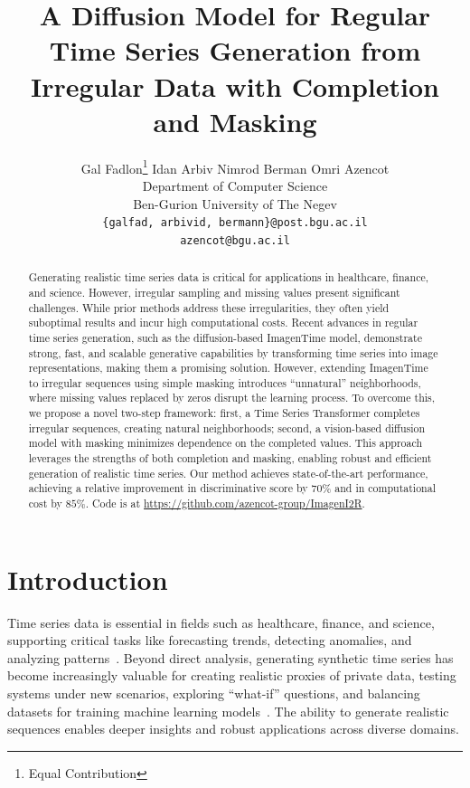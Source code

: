 \documentclass{article}
\title{A Diffusion Model for Regular Time Series Generation from Irregular Data with Completion and Masking}
\author{%
Gal Fadlon\thanks{Equal Contribution} \hspace{0.3em}
Idan Arbiv\footnotemark[1] \hspace{0.3em}
Nimrod Berman \hspace{0.3em}
Omri Azencot \\
Department of Computer Science \\
Ben-Gurion University of The Negev \\
\tt\small{{\{galfad, arbivid, bermann\}@post.bgu.ac.il}} \\
\tt\small{{azencot@bgu.ac.il}} \\
}
\theoremstyle{plain}
\theoremstyle{definition}
\theoremstyle{remark}
\begin{document}
\maketitle


\begin{abstract}
  Generating realistic time series data is critical for applications in healthcare, finance, and science. However, irregular sampling and missing values present significant challenges. While prior methods address these irregularities, they often yield suboptimal results and incur high computational costs. Recent advances in regular time series generation, such as the diffusion-based ImagenTime model, demonstrate strong, fast, and scalable generative capabilities by transforming time series into image representations, making them a promising solution. However, extending ImagenTime to irregular sequences using simple masking introduces ``unnatural'' neighborhoods, where missing values replaced by zeros disrupt the learning process. To overcome this, we propose a novel two-step framework: first, a Time Series Transformer completes irregular sequences, creating natural neighborhoods; second, a vision-based diffusion model with masking minimizes dependence on the completed values. This approach leverages the strengths of both completion and masking, enabling robust and efficient generation of realistic time series. Our method achieves state-of-the-art performance, achieving a relative improvement in discriminative score by $70\%$ and in computational cost by $85\%$. Code is at \url{https://github.com/azencot-group/ImagenI2R}.
\end{abstract}

\vspace{-5mm}
\section{Introduction}
\label{sec:intro}
\vspace{-2mm}

Time series data is essential in fields such as healthcare, finance, and science, supporting critical tasks like forecasting trends, detecting anomalies, and analyzing patterns~\cite{han2019review, ismail2019deep, lim2021time}. Beyond direct analysis, generating synthetic time series has become increasingly valuable for creating realistic proxies of private data, testing systems under new scenarios, exploring ``what-if'' questions, and balancing datasets for training machine learning models~\cite{brophy2023generative, nochumsohn2025data}. The ability to generate realistic sequences enables deeper insights and robust applications across diverse domains.
\end{document}
